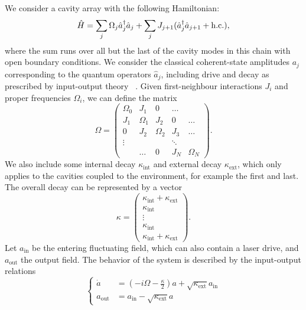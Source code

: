 \documentclass[10pt]{iopart}  %
\begin{document}
We consider a cavity array with the following Hamiltonian:
\begin{equation}
    {\hat H}=\sum_j  \Omega_j {\hat a}_j^{\dagger} {\hat a}_j + \sum_j J_{j+1} ({\hat a}_j^{\dagger} {\hat a}_{j+1} + {\rm h.c.}),
\end{equation}
where the sum runs over all but the last of the cavity modes in this chain with open boundary conditions.
We consider the classical coherent-state amplitudes $a_j$ corresponding to the quantum operators ${\hat a}_j$, including drive and decay as prescribed by input-output theory~ \cite{aspelmeyer_cavity_2014}.
Given first-neighbour interactions $J_i$ and proper frequencies $\Omega_i$, we can define the matrix
\begin{equation}
    \Omega = \begin{pmatrix}
        \Omega_0 & J_1      & 0        & \ldots &          \\
        J_1      & \Omega_1 & J_2      & 0      & \ldots   \\
        0        & J_2      & \Omega_2 & J_3    & \ldots   \\
        \vdots   &          &          & \ddots &          \\
                 & \ldots   & 0        & J_N    & \Omega_N
    \end{pmatrix}.
\end{equation}
%
We also include some internal decay $\kappa_\text{int}$ and external decay  $\kappa_\text{ext}$, which only applies to the cavities coupled to the environment, for example the first and last.
The overall decay can be represented by a vector
\begin{equation}
    \kappa = \begin{pmatrix}
        \kappa_{\text{int}} + \kappa_{\text{ext}} \\
        \kappa_{\text{int}}                       \\
        \vdots                                    \\
        \kappa_{\text{int}}                       \\
        \kappa_{\text{int}} + \kappa_{\text{ext}}
    \end{pmatrix}.
\end{equation}
Let $a_\text{in}$ be the entering fluctuating field, which can also contain a laser drive, and $a_\text{out}$ the output field.
The behavior of the system is described by the input-output relations \cite{cohadon_quantum_2020}
\begin{equation}
    \begin{cases}
        \dot a       & = \left(- i \Omega - \frac{\kappa}{2} \right) a + \sqrt{\kappa_\text{ext}} a_\text{in} \\
        a_\text{out} & = a_\text{in} - \sqrt{\kappa_\text{ext}} a
    \end{cases}
\end{equation}
\end{document}
